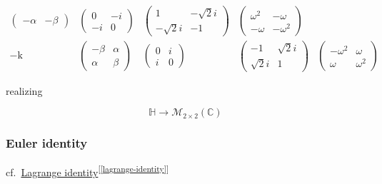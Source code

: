 \documentclass[
]{book}
\theoremstyle{definition}
\theoremstyle{definition}
\theoremstyle{definition}
\theoremstyle{definition}
\theoremstyle{remark}
\begin{document}
\[\begin{array}{ccccc}
\begin{pmatrix}
-\alpha & -\beta
\end{pmatrix} & \begin{pmatrix}0 & -i\\
-i & 0
\end{pmatrix} & \begin{pmatrix}1 & -\sqrt{2}i\\
-\sqrt{2}i & -1
\end{pmatrix} & \begin{pmatrix}\omega^{2} & -\omega\\
-\omega & -\omega^{2}
\end{pmatrix}\\
-\mathrm{k} & \begin{pmatrix}-\beta & \alpha\\
\alpha & \beta
\end{pmatrix} & \begin{pmatrix}0 & i\\
i & 0
\end{pmatrix} & \begin{pmatrix}-1 & \sqrt{2}i\\
\sqrt{2}i & 1
\end{pmatrix} & \begin{pmatrix}-\omega^{2} & \omega\\
\omega & \omega^{2}
\end{pmatrix}
\end{array}
\]

realizing

\[
\mathbb{H}\rightarrow\mathcal{M}_{2\times2}\left(\mathbb{C}\right)
\]

\subsubsection{Euler identity}\label{euler-identity}

cf.~\hyperref[lagrange-identity]{Lagrange identity}\textsuperscript{{[}\ref{lagrange-identity}{]}}
\end{document}
